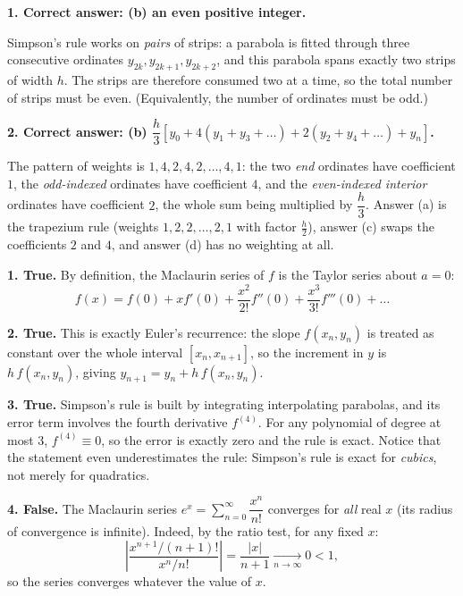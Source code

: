 \documentclass[11pt]{article}
\begin{document}
\begin{corrige}
\textbf{1. Correct answer: (b) an even positive integer.}

Simpson's rule works on \emph{pairs} of strips: a parabola is fitted through three consecutive ordinates $y_{2k}, y_{2k+1}, y_{2k+2}$, and this parabola spans exactly two strips of width $h$. The strips are therefore consumed two at a time, so the total number of strips must be even. (Equivalently, the number of ordinates must be odd.)

\textbf{2. Correct answer: (b) $\dfrac{h}{3}\left[y_0 + 4(y_1+y_3+\dots) + 2(y_2+y_4+\dots) + y_n\right]$.}

The pattern of weights is $1, 4, 2, 4, 2, \dots, 4, 1$: the two \emph{end} ordinates have coefficient $1$, the \emph{odd-indexed} ordinates have coefficient $4$, and the \emph{even-indexed interior} ordinates have coefficient $2$, the whole sum being multiplied by $\dfrac{h}{3}$. Answer (a) is the trapezium rule (weights $1,2,2,\dots,2,1$ with factor $\frac{h}{2}$), answer (c) swaps the coefficients $2$ and $4$, and answer (d) has no weighting at all.
\end{corrige}

\begin{corrige}
\textbf{1. True.} By definition, the Maclaurin series of $f$ is the Taylor series about $a = 0$:
\[ f(x) = f(0) + xf'(0) + \frac{x^2}{2!}f''(0) + \frac{x^3}{3!}f'''(0) + \dots \]

\textbf{2. True.} This is exactly Euler's recurrence: the slope $f(x_n, y_n)$ is treated as constant over the whole interval $[x_n, x_{n+1}]$, so the increment in $y$ is $h\,f(x_n,y_n)$, giving $y_{n+1} = y_n + h\,f(x_n, y_n)$.

\textbf{3. True.} Simpson's rule is built by integrating interpolating parabolas, and its error term involves the fourth derivative $f^{(4)}$. For any polynomial of degree at most $3$, $f^{(4)} \equiv 0$, so the error is exactly zero and the rule is exact. Notice that the statement even underestimates the rule: Simpson's rule is exact for \emph{cubics}, not merely for quadratics.

\textbf{4. False.} The Maclaurin series $e^x = \displaystyle\sum_{n=0}^{\infty} \dfrac{x^n}{n!}$ converges for \emph{all} real $x$ (its radius of convergence is infinite). Indeed, by the ratio test, for any fixed $x$:
\[ \left|\frac{x^{n+1}/(n+1)!}{x^n/n!}\right| = \frac{|x|}{n+1} \xrightarrow[n\to\infty]{} 0 < 1, \]
so the series converges whatever the value of $x$.
\end{corrige}
\end{document}
